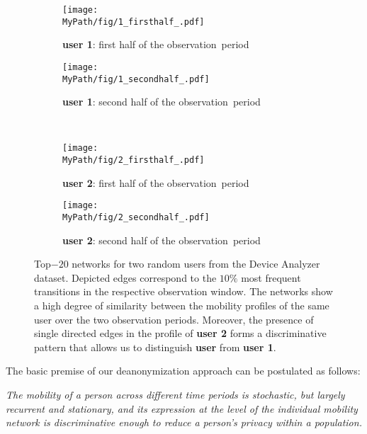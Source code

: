\begin{figure}[!h]
	\centering
	\begin{subfigure}[]{0.49\textwidth}
		\centering		\texttt{[image: \\MyPath/fig/1\_firsthalf\_.pdf]}
		\caption{{\textbf{user 1}: first half of the \mbox{observation period}}}
		\label{fig:evidence11}
	\end{subfigure}%
	\begin{subfigure}[]{0.49\textwidth}
		\centering
		\texttt{[image: \\MyPath/fig/1\_secondhalf\_.pdf]}
		\caption{{\textbf{user 1}: second half of the \mbox{observation period}}}
		\label{fig:evidence12}
	\end{subfigure}%
	\\
	\begin{subfigure}[]{0.49\textwidth}
		\centering
		\texttt{[image: \\MyPath/fig/2\_firsthalf\_.pdf]}
		\caption{{\textbf{user 2}: first half of the \mbox{observation period}}}
		\label{fig:evidence21}
	\end{subfigure}
	\begin{subfigure}[]{0.49\textwidth}
		\centering
		\texttt{[image: \\MyPath/fig/2\_secondhalf\_.pdf]}
		\caption{{\textbf{user 2}: second half of the \mbox{observation period}}}
		\label{fig:evidence22}
	\end{subfigure}
	\caption{{Top$-20$ networks for two random users from the Device Analyzer dataset.
  Depicted edges correspond to the $10\%$ most frequent transitions in the respective observation window.
  The networks show a high degree of similarity between the mobility profiles of the same user over the two observation periods.
  Moreover, the presence of single directed edges in the profile of \textbf{user 2} forms a discriminative pattern that allows us to distinguish \textbf{user} from \textbf{user 1}.}}
	\label{fig:evidence}
\end{figure}


The basic premise of our deanonymization approach can be postulated as follows:

\emph{
	The mobility of a person across different time periods is stochastic, but largely recurrent and stationary, and its expression at the level of the individual mobility network is discriminative enough to reduce a person's privacy within a population.}

